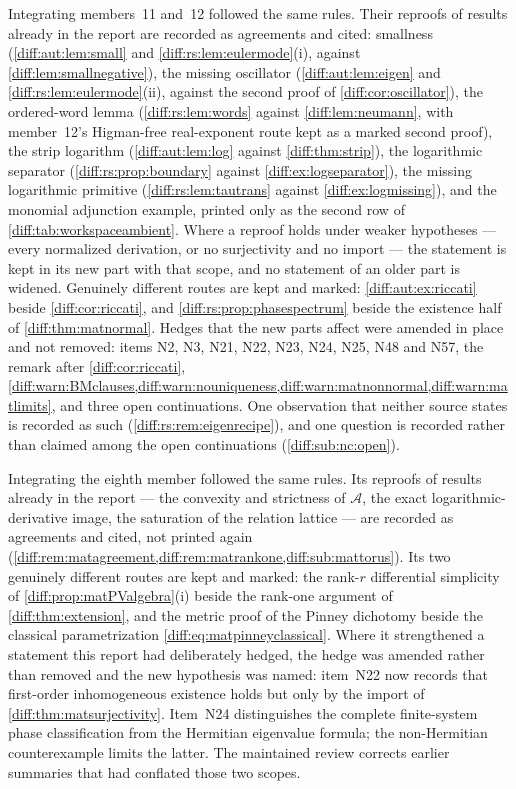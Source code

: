 \documentclass[11pt,letterpaper]{article}
\numberwithin{equation}{section}
\theoremstyle{definition}
\theoremstyle{remark}
\newcommand{\Acl}{\mathcal A}
\begin{document}
\begin{remark}
Integrating members~11 and~12 followed the same rules. Their reproofs of results
already in the report are recorded as agreements and cited: smallness
(\cref{diff:aut:lem:small} and \cref{diff:rs:lem:eulermode}(i), against
\cref{diff:lem:smallnegative}), the missing oscillator
(\cref{diff:aut:lem:eigen} and \cref{diff:rs:lem:eulermode}(ii), against the
second proof of \cref{diff:cor:oscillator}), the ordered-word lemma (\cref{diff:rs:lem:words}
against \cref{diff:lem:neumann}, with member~12's Higman-free real-exponent route
kept as a marked second proof), the strip logarithm (\cref{diff:aut:lem:log}
against \cref{diff:thm:strip}), the logarithmic separator
(\cref{diff:rs:prop:boundary} against \cref{diff:ex:logseparator}), the missing
logarithmic primitive (\cref{diff:rs:lem:tautrans} against
\cref{diff:ex:logmissing}), and the monomial adjunction example, printed only as
the second row of \cref{diff:tab:workspaceambient}. Where a reproof holds under
weaker hypotheses --- every normalized derivation, or no surjectivity and no
import --- the statement is kept in its new part with that scope, and no statement
of an older part is widened. Genuinely different routes are kept and marked:
\cref{diff:aut:ex:riccati} beside \cref{diff:cor:riccati}, and
\cref{diff:rs:prop:phasespectrum} beside the existence half of
\cref{diff:thm:matnormal}. Hedges that the new parts affect were amended in place
and not removed: items N2, N3, N21, N22, N23, N24, N25, N48 and N57, the remark
after \cref{diff:cor:riccati}, \cref{diff:warn:BMclauses,diff:warn:nouniqueness,diff:warn:matnonnormal,diff:warn:matlimits},
and three open continuations. One observation that neither source states is
recorded as such (\cref{diff:rs:rem:eigenrecipe}), and one question is recorded
rather than claimed among the open continuations (\cref{diff:sub:nc:open}).

Integrating the eighth member followed the same rules. Its reproofs of results
already in the report --- the convexity and strictness of $\Acl$, the exact
logarithmic-derivative image, the saturation of the relation lattice --- are
recorded as agreements and cited, not printed again
(\cref{diff:rem:matagreement,diff:rem:matrankone,diff:sub:mattorus}). Its two
genuinely different routes are kept and marked: the rank-$r$ differential
simplicity of \cref{diff:prop:matPValgebra}(i) beside the rank-one argument of
\cref{diff:thm:extension}, and the metric proof of the Pinney dichotomy beside
the classical parametrization \cref{diff:eq:matpinneyclassical}. Where it
strengthened a statement this report had deliberately hedged, the hedge was
amended rather than removed and the new hypothesis was named: item~N22 now
records that first-order inhomogeneous existence holds but only by the import
of \cref{diff:thm:matsurjectivity}. Item~N24 distinguishes the complete
finite-system phase classification from the Hermitian eigenvalue formula; the
non-Hermitian counterexample limits the latter. The maintained review corrects
earlier summaries that had conflated those two scopes.
\end{remark}
\end{document}
